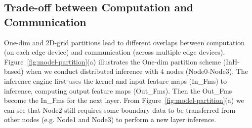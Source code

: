 




\subsection{Trade-off between Computation and Communication }
\label{sec:trade-off}


One-dim and 2D-grid partitions lead to different overlaps between computation (on each edge device) and communication (across multiple edge devices). Figure~\ref{fig:model-partition}(a) illustrates the One-dim partition scheme (InH-based) when we conduct distributed inference with 4 nodes (Node0-Node3). The inference engine first uses the kernel and input feature maps (In\_Fms) to inference, computing output feature maps (Out\_Fms). Then the Out\_Fms become the In\_Fms for the next layer. From Figure~\ref{fig:model-partition}(a) we can see that Node2 still requires some boundary data to be transferred from other nodes (e.g. Node1 and Node3) to perform a new layer inference. 

